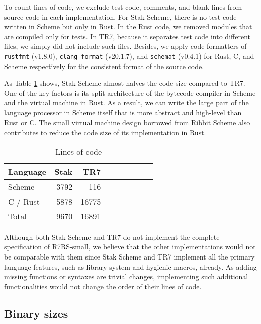 \documentclass[sigplan, anonymous, review]{acmart}
\begin{document}
To count lines of code, we exclude test code, comments, and blank
lines from source code in each implementation.
For Stak Scheme, there is no test code written in Scheme but only in Rust.
In the Rust code, we removed modules that are compiled only for tests.
In TR7, because it separates test code into different files, we simply did not
include such files.
Besides, we apply code formatters of \texttt{rustfmt} (v1.8.0),
\texttt{clang-format} (v20.1.7), and \texttt{schemat} (v0.4.1) for
Rust, C, and Scheme respectively for the consistent format of the source code.

As Table \ref{table:loc} shows, Stak Scheme almost
halves the code size compared to TR7.
One of the key factors is its split architecture of the bytecode
compiler in Scheme and the virtual machine in Rust.
As a result, we can write the large part of the language processor in Scheme
itself that is more abstract and high-level than Rust or C.
The small virtual machine design borrowed from Ribbit Scheme also
contributes to reduce the code size of its implementation in Rust.

\begin{table}
  \begin{center}
    \caption{Lines of code}
    \label{table:loc}
    \begin{tabular}{l|rrrrrrrr}
      \hline
      Language & Stak & TR7  \\
      \hline
      Scheme & 3792 & 116 \\
      C / Rust & 5878 & 16775 \\
      Total & 9670 & 16891 \\
      \hline
    \end{tabular}
  \end{center}
\end{table}

Although both Stak Scheme and TR7 do not implement the complete
specification of R7RS-small, we believe that the other
implementations would not be comparable with them since
Stak Scheme and TR7 implement all the primary language features,
such as library system and hygienic macros, already.
As adding missing functions or syntaxes are trivial changes,
implementing such additional functionalities would not change the
order of their lines of code.

\subsection{Binary sizes}
\end{document}
